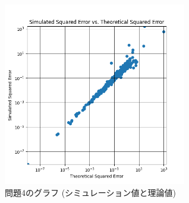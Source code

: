 \documentclass[a4paper, 10pt, dvipdfmx]{jlreq}
\begin{document}


\begin{figure}[htbp]
  \begin{center}
    \includegraphics[height=80mm]{2.png}
    \caption{問題4のグラフ (シミュレーション値と理論値)}
  \end{center}
\end{figure}
\end{document}
